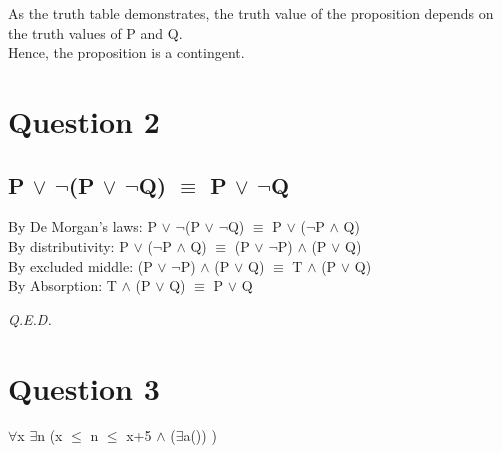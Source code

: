 \documentclass[a4paper]{article}
\begin{document}
As the truth table demonstrates, the truth value of the proposition depends on
the truth values of P and Q.\\
Hence, the proposition is a contingent.


\section*{Question 2}
\subsection*{P $\lor$ $\neg$(P $\lor$ $\neg$Q) $\equiv$ P $\lor$ $\neg$Q}
By De Morgan's laws: P $\lor$ $\neg$(P $\lor$ $\neg$Q) $\equiv$ P $\lor$ ($\neg$P $\land$ Q)\\
By distributivity:\;\;\;\;\;\;\; P $\lor$ ($\neg$P $\land$ Q) $\equiv$ (P $\lor$ $\neg$P) $\land$ (P $\lor$ Q)\\
By excluded middle:\;\; (P $\lor$ $\neg$P) $\land$ (P $\lor$ Q) $\equiv$ T $\land$ (P $\lor$ Q)\\
By Absorption:\;\;\;\;\;\;\;\;\;\; T $\land$ (P $\lor$ Q) $\equiv$ P $\lor$ Q

\vspace{10pt}

\emph{Q.E.D.}

\section*{Question 3}
$\forall$x $\exists$n (x $\le$ n $\leq$ x+5 $\land$
($\exists$a())
)
\end{document}
